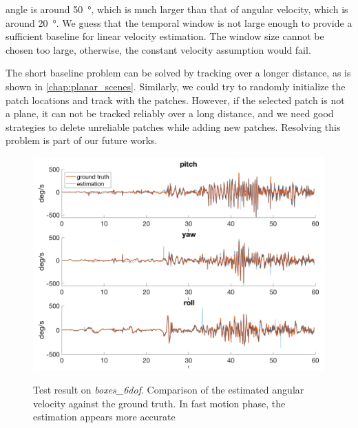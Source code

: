   angle is around \SI{50}{\degree}, which is much larger than that of
  angular velocity, which is around \SI{20}{\degree}. We guess that
  the temporal window is not large enough to provide a sufficient
  baseline for linear velocity estimation. The window size cannot be
  chosen too large, otherwise, the constant velocity assumption would
  fail.

  The short baseline problem can be solved by tracking over a longer
  distance, as is shown in \cref{chap:planar_scenes}. Similarly, we
  could try to randomly initialize the patch locations and track with
  the patches. However, if the selected patch is not a plane, it can
  not be tracked reliably over a long distance, and we need good
  strategies to delete unreliable patches while adding new
  patches. Resolving this problem is part of our future works.

\begin{figure}
  \centering \includegraphics[width =
  \textwidth]{images/boxes_6dof_rotation_.png}
  \label{fig:boxes_6dof_rotation}
  \caption{Test result on \emph{boxes\_6dof}. Comparison of the
    estimated angular velocity against the ground truth. In fast
    motion phase, the estimation appears more accurate}
\end{figure}

